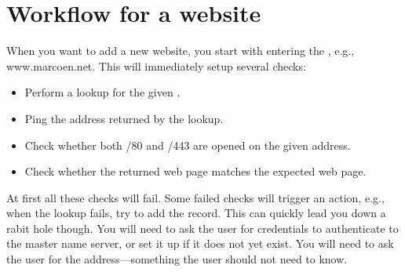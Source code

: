 \documentclass[a4paper,12pt]{scrartcl}
\begin{document}
\section{Workflow for a website}
When you want to add a new website, you start with entering the , e.g., www.marcoen.net.
This will immediately setup several checks:
\begin{itemize}
\item
    Perform a  lookup for the given .
\item
    Ping the  address returned by the  lookup.
\item
    Check whether both /80 and /443 are opened on the given  address.
\item
    Check whether the returned web page matches the expected web page.
\end{itemize}
At first all these checks will fail.
Some failed checks will trigger an action, e.g., when the  lookup fails, try to add the  record.
This can quickly lead you down a rabit hole though.
You will need to ask the user for credentials to authenticate to the master name server, or set it up if it does not yet exist.
You will need to ask the user for the  address---something the user should not need to know.
\end{document}
